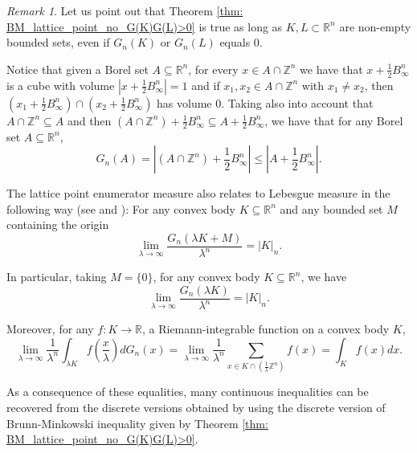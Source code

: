 \documentclass{amsart}
\newcommand{\R}{\mathbb R}
\newcommand{\Z}{\mathbb Z}
\theoremstyle{remark}
\newtheorem{rmk}{Remark}
\theoremstyle{definition}
\numberwithin{equation}{section}
\begin{document}
\begin{rmk}
Let us point out that Theorem \ref{thm: BM_lattice_point_no_G(K)G(L)>0} is true as long as $K,L\subset\R^n$ are non-empty bounded sets, even if $G_n(K)$ or $G_n(L)$ equals 0.
\end{rmk}

Notice that given a Borel set $A\subseteq\R^n$, for every $x\in A\cap\Z^n$ we have that $x+\frac{1}{2}B_\infty^n$ is a cube with volume $|x+\frac{1}{2}B_\infty^n|=1$ and if $x_1,x_2\in A\cap\Z^n$ with $x_1\neq x_2$, then  $(x_1+\frac{1}{2}B_\infty^n)\cap(x_2+\frac{1}{2}B_\infty^n)$ has volume 0. Taking also into account that $A\cap\Z^n\subseteq A$ and then $(A\cap\Z^n)+\frac{1}{2}B_\infty^n\subseteq A+\frac{1}{2}B_\infty^n$, we have that for any Borel set $A\subseteq\R^n$,
\begin{equation}\label{eq:LatticePointAndVolume}
G_n(A)=\left|(A\cap\Z^n)+\frac{1}{2}B_\infty^n\right|\leq\left|A+\frac{1}{2}B_\infty^n\right|.
\end{equation}

The lattice point enumerator measure also relates to Lebesgue measure in the following way (see \cite[Lem. 3.22]{TV} and \cite[Sect. 3.1]{ALY}): For any convex body $K \subseteq \R^n$ and any bounded set $M$ containing the origin
\begin{equation}\label{discrete_continuous_volume}
\lim_{\lambda \to \infty} \frac{G_n(\lambda K+M)}{\lambda^n} = |K|_n.
\end{equation}

In particular, taking $M=\{0\}$, for any convex body $K \subseteq \R^n$, we have
$$
\lim_{\lambda \to \infty} \frac{G_n(\lambda K)}{\lambda^n} = |K|_n.
$$

Moreover, for any $f: K \to \R$, a Riemann-integrable function on a convex body $K$,
\begin{equation} \label{Riemann_integrability}
\lim_{\lambda \to \infty} \frac{1}{\lambda^n} \int_{\lambda K} f\left( \frac{x}{\lambda} \right) dG_n(x) = \lim_{\lambda \to \infty} \frac{1}{\lambda^n} \sum_{x \in K \cap \left(\frac{1}{\lambda}\Z^n \right)} f(x) = \int_K f(x) dx.
\end{equation}


As a consequence of these equalities, many continuous inequalities can be recovered from the discrete versions obtained by using the discrete version of Brunn-Minkowski inequality given by Theorem \ref{thm: BM_lattice_point_no_G(K)G(L)>0}.
\end{document}
